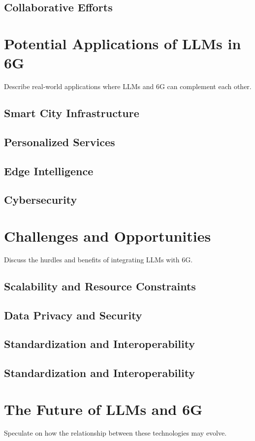 \documentclass[12pt]{article}
\begin{document}
	\subsection{Collaborative Efforts}
\newpage	
\section{Potential Applications of LLMs in 6G}
Describe real-world applications where LLMs and 6G can complement each other.
	\subsection{Smart City Infrastructure}
	\subsection{Personalized Services}
	\subsection{Edge Intelligence}
	\subsection{Cybersecurity}
\newpage
\section{Challenges and Opportunities}
Discuss the hurdles and benefits of integrating LLMs with 6G.
	\subsection{Scalability and Resource Constraints}
	\subsection{Data Privacy and Security}
	\subsection{Standardization and Interoperability}
	\subsection{Standardization and Interoperability}
\newpage
\section{The Future of LLMs and 6G}
Speculate on how the relationship between these technologies may evolve.
\end{document}
